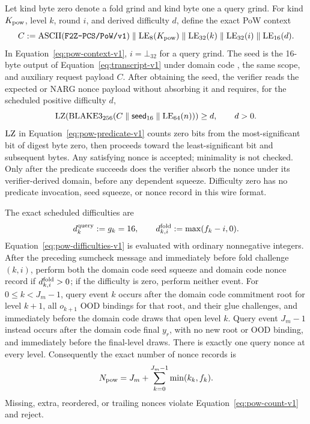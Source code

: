 Let kind byte zero denote a fold grind and kind byte one a query grind.  For
kind $K_{\rm pow}$, level $k$, round $i$, and derived difficulty $d$, define
the exact PoW context
\begin{equation}
 C:=\operatorname{ASCII}(\texttt{F2Z-PCS/PoW/v1})\parallel
 \operatorname{LE}_{8}(K_{\rm pow})\parallel\operatorname{LE}_{32}(k)\parallel
 \operatorname{LE}_{32}(i)\parallel\operatorname{LE}_{16}(d).
 \label{eq:pow-context-v1}
\end{equation}
In Equation~\eqref{eq:pow-context-v1}, $i=\bot_{32}$ for a query grind.  The seed is the 16-byte output of
Equation~\eqref{eq:transcript-v1} under domain code , the same scope, and
auxiliary request payload $C$.  After obtaining the seed, the verifier reads
the expected  or  NARG nonce payload without absorbing it and
requires, for the scheduled positive difficulty $d$,
\begin{equation}
 \operatorname{LZ}\!\left(\operatorname{BLAKE3}_{256}
   (C\parallel\mathsf{seed}_{16}\parallel\operatorname{LE}_{64}(n))\right)\ge d,
 \qquad d>0.
 \label{eq:pow-predicate-v1}
\end{equation}
$\operatorname{LZ}$ in Equation~\eqref{eq:pow-predicate-v1} counts zero bits from the
most-significant bit of digest byte zero, then proceeds toward the
least-significant bit and subsequent bytes.  Any satisfying nonce is accepted;
minimality is not checked.  Only after the predicate succeeds does
the verifier absorb the nonce under its verifier-derived domain, before any
dependent squeeze.
Difficulty zero has no predicate invocation, seed squeeze, or nonce record in
this wire format.

The exact scheduled difficulties are
\begin{equation}
 d^{\rm query}_k:=g_k=16,
 \qquad
 d^{\rm fold}_{k,i}:=\max(f_k-i,0).
 \label{eq:pow-difficulties-v1}
\end{equation}
Equation~\eqref{eq:pow-difficulties-v1} is evaluated with ordinary
nonnegative integers.  After the preceding sumcheck message and immediately
before fold challenge $(k,i)$, perform both the domain code  seed squeeze
and domain code  nonce record if $d^{\rm fold}_{k,i}>0$; if the difficulty
is zero, perform neither event.  For $0\le k<J_m-1$, query event $k$ occurs after the
domain code  commitment root for level $k+1$, all $o_{k+1}$ OOD bindings
for that root, and their glue challenges, and immediately before the domain code 
draws that open level $k$.  Query event $J_m-1$ instead occurs after the
domain code  final $y_r$, with no new root or OOD binding, and immediately
before the final-level draws.  There is exactly one query nonce at every level.
Consequently the exact number of nonce records is
\begin{equation}
 N_{\rm pow}=J_m+\sum_{k=0}^{J_m-1}\min(k_k,f_k).
 \label{eq:pow-count-v1}
\end{equation}
Missing, extra, reordered, or trailing nonces violate
Equation~\eqref{eq:pow-count-v1} and reject.

